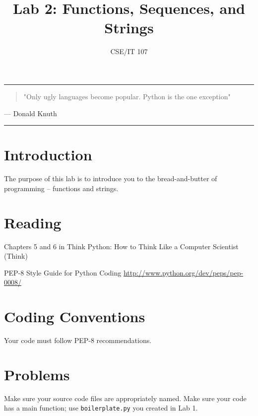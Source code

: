 \documentclass[12pt]{article}
\title{Lab 2: Functions, Sequences, and Strings}
\author{CSE/IT 107}
\date{}
\begin{document}
\maketitle

\hrule
\begin{quotation}
"Only ugly languages become popular. Python is the one exception"
\end{quotation}

\begin{flushright}
--- Donald Knuth
\end{flushright}

\hrule
\section{Introduction}

The purpose of this lab is to introduce you to the bread-and-butter of programming -- functions and strings.

\section*{Reading}

Chapters 5 and 6 in Think Python: How to Think Like a Computer Scientist (Think)

PEP-8 Style Guide for Python Coding \url{http://www.python.org/dev/peps/pep-0008/}
\section*{Coding Conventions}

Your code must follow PEP-8 recommendations. 

\section*{Problems}

Make sure your source code files are appropriately named. Make sure your code has a main function; use \texttt{boilerplate.py} you created in Lab 1.
\end{document}
